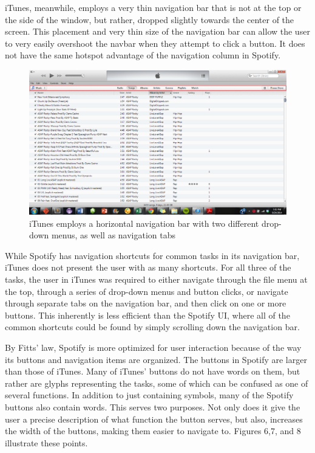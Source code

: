 \documentclass[12pt]{article}
\begin{document}
iTunes, meanwhile, employs a very thin navigation bar that is not 
at the top or the side of the window, but rather, dropped slightly 
towards the center of the screen. This placement and very thin 
size of the navigation bar can allow the user to very easily 
overshoot the navbar when they attempt to click a button. It does 
not have the same hotspot advantage of the navigation column in 
Spotify.

\begin{figure}[H]
	\centering
	\includegraphics[width=\textwidth]{chart5.png}
	\caption{iTunes employs a horizontal navigation bar with 
two different drop-down menus, as well as navigation tabs}
\end{figure}

While Spotify has navigation shortcuts for common tasks in its 
navigation bar, iTunes does not present the user with as many 
shortcuts. For all three of the tasks, the user in iTunes was 
required to either navigate through the file menu at the top, 
through a series of drop-down menus and button clicks, or navigate 
through separate tabs on the navigation bar, and then click on one 
or more buttons. This inherently is less efficient than the 
Spotify UI, where all of the common shortcuts could be found by 
simply scrolling down the navigation bar. 

By Fitts' law, Spotify is more optimized for user interaction 
because of the way its buttons and navigation items are organized. 
The buttons in Spotify are larger than those of iTunes. Many of 
iTunes' buttons do not have words on them, but rather are glyphs 
representing the tasks, some of which can be confused as one of 
several functions.
In addition to just containing symbols, many of 
the Spotify buttons also contain words. This serves two purposes. 
Not only does it give the user a precise description of what 
function the button serves, but also, increases the width of the 
buttons, making them easier to navigate to. Figures 6,7, and 8
illustrate these points.
\end{document}
